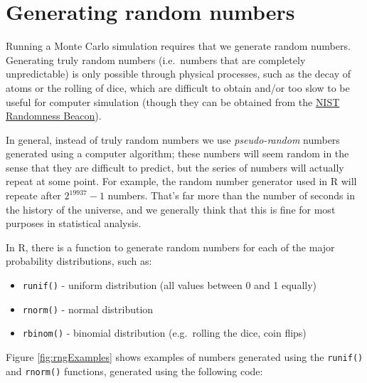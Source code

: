 \documentclass[]{book}
\providecommand{\tightlist}{%
  \setlength{\itemsep}{0pt}\setlength{\parskip}{0pt}}
\theoremstyle{definition}
\theoremstyle{definition}
\theoremstyle{definition}
\theoremstyle{remark}
\begin{document}
\section{Generating random numbers}\label{generating-random-numbers}

Running a Monte Carlo simulation requires that we generate random
numbers. Generating truly random numbers (i.e.~numbers that are
completely unpredictable) is only possible through physical processes,
such as the decay of atoms or the rolling of dice, which are difficult
to obtain and/or too slow to be useful for computer simulation (though
they can be obtained from the
\href{https://www.nist.gov/programs-projects/nist-randomness-beacon\%5D}{NIST
Randomness Beacon}).

In general, instead of truly random numbers we use \emph{pseudo-random}
numbers generated using a computer algorithm; these numbers will seem
random in the sense that they are difficult to predict, but the series
of numbers will actually repeat at some point. For example, the random
number generator used in R will repeate after \(2^{19937} - 1\) numbers.
That's far more than the number of seconds in the history of the
universe, and we generally think that this is fine for most purposes in
statistical analysis.

In R, there is a function to generate random numbers for each of the
major probability distributions, such as:

\begin{itemize}
\tightlist
\item
  \texttt{runif()} - uniform distribution (all values between 0 and 1
  equally)
\item
  \texttt{rnorm()} - normal distribution
\item
  \texttt{rbinom()} - binomial distribution (e.g.~rolling the dice, coin
  flips)
\end{itemize}

Figure \ref{fig:rngExamples} shows examples of numbers generated using
the \texttt{runif()} and \texttt{rnorm()} functions, generated using the
following code:
\end{document}
